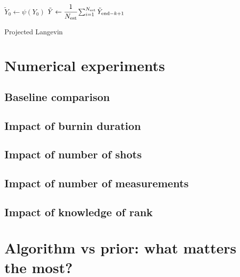 \documentclass[12pt]{memoir}
\begin{document}
\begin{algorithm}[H]
    \DontPrintSemicolon

    $\tilde Y_0 \gets \psi(Y_0)$\;
    $\tilde Y \gets \cfrac{1}{N_{\text{est}}} \sum_{i=1}^{N_{\text{est}}} \tilde Y_{\text{end} - k +1}$\;
    \caption{Projected Langevin}
\end{algorithm}



\chapter{Numerical experiments}

\section{Baseline comparison}

\section{Impact of burnin duration}

\section{Impact of number of shots}

\section{Impact of number of measurements}

\section{Impact of knowledge of rank}

\chapter{Algorithm vs prior: what matters the most?}
\end{document}
